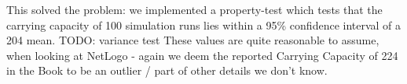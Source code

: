 This solved the problem: we implemented a property-test which tests that the carrying capacity of 100 simulation runs lies within a 95\% confidence interval of a 204 mean. TODO: variance test
These values are quite reasonable to assume, when looking at NetLogo - again we deem the reported Carrying Capacity of 224 in the Book to be an outlier / part of other details we don't know.